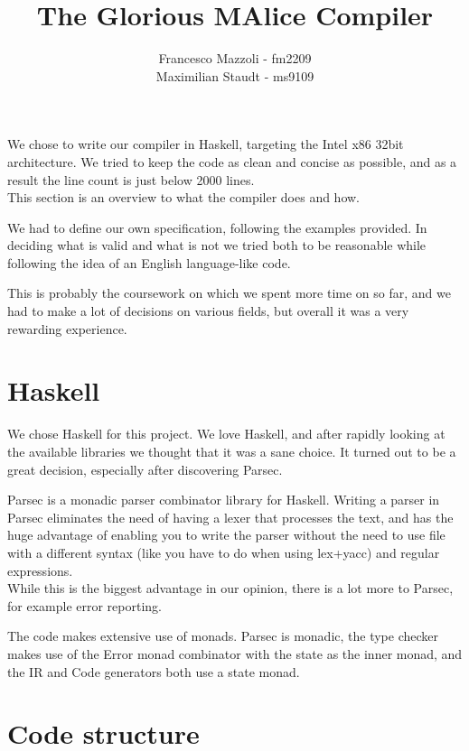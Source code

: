\documentclass{article}
\begin{document}
\title{The Glorious MAlice Compiler}

\author{Francesco Mazzoli - fm2209\\Maximilian Staudt - ms9109}

\maketitle

We chose to write our compiler in Haskell, targeting the Intel x86
32bit architecture. We tried to keep the code as clean and concise as
possible, and as a result the line count is just below 2000 lines.\\
This section is an overview to what the compiler does and how.

We had to define our own specification, following the examples
provided. In deciding what is valid and what is not we tried both to
be reasonable while following the idea of an English language-like
code.

This is probably the coursework on which we spent more time on so far,
and we had to make a lot of decisions on various fields, but overall
it was a very rewarding experience.

\section{Haskell}
We chose Haskell for this project. We love Haskell, and after rapidly
looking at the available libraries we thought that it was a sane
choice. It turned out to be a great decision, especially after
discovering Parsec.

Parsec is a monadic parser combinator library for Haskell. Writing a
parser in Parsec eliminates the need of having a lexer that processes
the text, and has the huge advantage of enabling you to write the
parser without the need to use file with a different syntax (like you
have to do when using lex+yacc) and regular expressions.\\ While this
is the biggest advantage in our opinion, there is a lot more to
Parsec, for example error reporting.

The code makes extensive use of monads. Parsec is monadic, the type
checker makes use of the Error monad combinator with the state as the
inner monad, and the IR and Code generators both use a state monad.

\section{Code structure}
\end{document}
